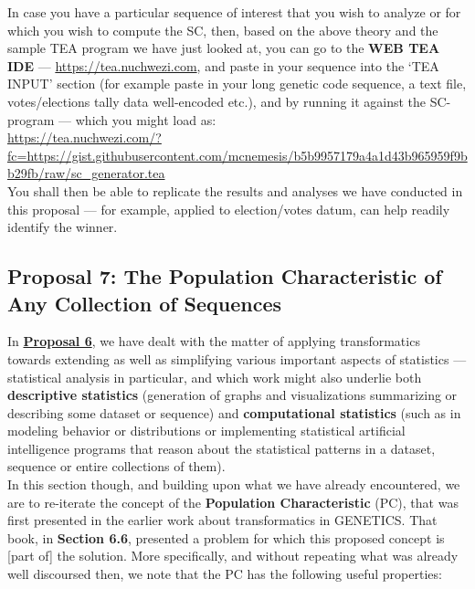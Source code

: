 \documentclass[a4paper, 18pt]{book} %
\begin{document}
\begin{appendices}
  \vspace{2em}

In case you have a particular sequence of interest that you wish to analyze or for which you wish to compute the SC, then, based on the above theory and the sample TEA program we have just looked at, you can go to the \textbf{WEB TEA IDE} --- \url{https://tea.nuchwezi.com}, and paste in your sequence into the `TEA INPUT' section (for example paste in your long genetic code sequence, a text file, votes/elections tally data well-encoded etc.), and by running it against the SC-program --- which you might load as:\\

\url{https://tea.nuchwezi.com/?fc=https://gist.githubusercontent.com/mcnemesis/b5b9957179a4a1d43b965959f9bb29fb/raw/sc_generator.tea}\\


You shall then be able to replicate the results and analyses we have conducted in this proposal --- for example, applied to election/votes datum, can help readily identify the winner.


\subsection{Proposal 7: The Population Characteristic of Any Collection of Sequences\cite{lutalo_2025_trans_genetics}}
\label{PROP7}


In \textbf{\hyperref[PROP6]{Proposal 6}}, we have dealt with the matter of applying transformatics towards extending as well as simplifying various important aspects of statistics --- statistical analysis in particular, and which work might also underlie both \textbf{descriptive statistics} (generation of graphs and visualizations summarizing or describing some dataset or sequence) and \textbf{computational statistics} (such as in modeling behavior or distributions or implementing statistical artificial intelligence programs that reason about the statistical patterns in a dataset, sequence or entire collections of them).\\


In this section though, and building upon what we have already encountered, we are to re-iterate the concept of the \textbf{Population Characteristic} (PC), that was first presented in the earlier work about transformatics in GENETICS\cite{lutalo_2025_trans_genetics}. That book, in 	\textbf{Section 6.6}, presented a problem for which this proposed concept is [part of] the solution. More specifically, and without repeating what was already well discoursed then, we note that the PC has the following useful properties:


\end{appendices}
\end{document}
